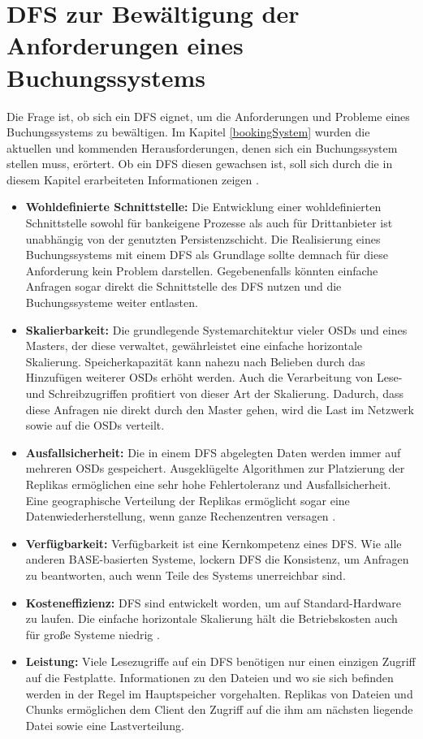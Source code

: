 \documentclass[12pt,oneside,a4paper,parskip]{scrbook}
\begin{document}
\section{DFS zur Bewältigung der Anforderungen eines Buchungssystems}
Die Frage ist, ob sich ein DFS eignet, um die Anforderungen und Probleme eines Buchungssystems zu bewältigen.
Im Kapitel \ref{bookingSystem} wurden die aktuellen und kommenden Herausforderungen, denen sich ein Buchungssystem stellen muss, erörtert. Ob ein DFS diesen gewachsen ist, soll sich durch die in diesem Kapitel erarbeiteten Informationen zeigen \cite{largeHadoop}.


\begin{itemize}
  \item \textbf{Wohldefinierte Schnittstelle:} Die Entwicklung einer wohldefinierten Schnittstelle sowohl für bankeigene Prozesse als auch für Drittanbieter ist unabhängig von der genutzten Persistenzschicht. Die Realisierung eines Buchungssystems mit einem DFS als Grundlage sollte demnach für diese Anforderung kein Problem darstellen. Gegebenenfalls könnten einfache Anfragen sogar direkt die Schnittstelle des DFS nutzen und die Buchungssysteme weiter entlasten.

  \item \textbf{Skalierbarkeit:} Die grundlegende Systemarchitektur vieler OSDs und eines Masters, der diese verwaltet, gewährleistet eine einfache horizontale Skalierung. Speicherkapazität kann nahezu nach Belieben durch das Hinzufügen weiterer OSDs erhöht werden. Auch die Verarbeitung von Lese- und Schreibzugriffen profitiert von dieser Art der Skalierung. Dadurch, dass diese Anfragen nie direkt durch den Master gehen, wird die Last im Netzwerk sowie auf die OSDs verteilt.

  \item \textbf{Ausfallsicherheit:} Die in einem DFS abgelegten Daten werden immer auf mehreren OSDs gespeichert. Ausgeklügelte Algorithmen zur Platzierung der Replikas ermöglichen eine sehr hohe Fehlertoleranz und Ausfallsicherheit. Eine geographische Verteilung der Replikas ermöglicht sogar eine Datenwiederherstellung, wenn ganze Rechenzentren versagen \cite{osvideo}.

  \item \textbf{Verfügbarkeit:} Verfügbarkeit ist eine Kernkompetenz eines DFS. Wie alle anderen BASE-basierten Systeme, lockern DFS die Konsistenz, um Anfragen zu beantworten, auch wenn Teile des Systems unerreichbar sind.

  \item \textbf{Kosteneffizienz:} DFS sind entwickelt worden, um auf Standard-Hardware zu laufen. Die einfache horizontale Skalierung hält die Betriebskosten auch für große Systeme niedrig \cite{rdbmssuck}.

  \item \textbf{Leistung:} Viele Lesezugriffe auf ein DFS benötigen nur einen einzigen Zugriff auf die Festplatte. Informationen zu den Dateien und wo sie sich befinden werden in der Regel im Hauptspeicher vorgehalten. Replikas von Dateien und Chunks ermöglichen dem Client den Zugriff auf die ihm am nächsten liegende Datei sowie eine Lastverteilung. 
\end{itemize}
\end{document}
